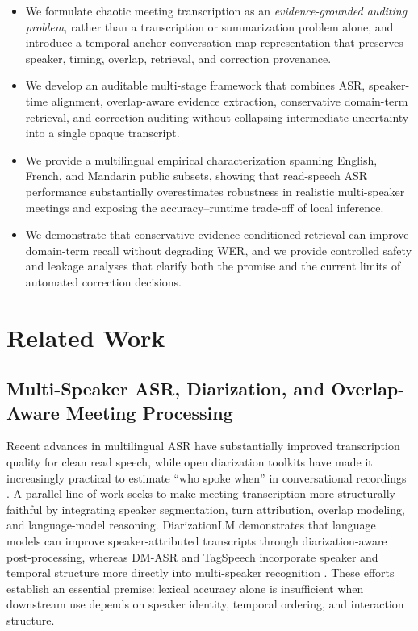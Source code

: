 \documentclass[10pt,twocolumn]{article}
\begin{document}
\begin{itemize}
    \item We formulate chaotic meeting transcription as an \textit{evidence-grounded auditing problem}, rather than a transcription or summarization problem alone, and introduce a temporal-anchor conversation-map representation that preserves speaker, timing, overlap, retrieval, and correction provenance.
    \item We develop an auditable multi-stage framework that combines ASR, speaker-time alignment, overlap-aware evidence extraction, conservative domain-term retrieval, and correction auditing without collapsing intermediate uncertainty into a single opaque transcript.
    \item We provide a multilingual empirical characterization spanning English, French, and Mandarin public subsets, showing that read-speech ASR performance substantially overestimates robustness in realistic multi-speaker meetings and exposing the accuracy--runtime trade-off of local inference.
    \item We demonstrate that conservative evidence-conditioned retrieval can improve domain-term recall without degrading WER, and we provide controlled safety and leakage analyses that clarify both the promise and the current limits of automated correction decisions.
\end{itemize}

\section{Related Work}

\subsection{Multi-Speaker ASR, Diarization, and Overlap-Aware Meeting Processing}

Recent advances in multilingual ASR have substantially improved transcription quality for clean read speech, while open diarization toolkits have made it increasingly practical to estimate ``who spoke when'' in conversational recordings \cite{radford2023whisper,bredin2020pyannote}. A parallel line of work seeks to make meeting transcription more structurally faithful by integrating speaker segmentation, turn attribution, overlap modeling, and language-model reasoning. DiarizationLM demonstrates that language models can improve speaker-attributed transcripts through diarization-aware post-processing, whereas DM-ASR and TagSpeech incorporate speaker and temporal structure more directly into multi-speaker recognition \cite{wang2024diarizationlm,li2026dmasr,huo2026tagspeech}. These efforts establish an essential premise: lexical accuracy alone is insufficient when downstream use depends on speaker identity, temporal ordering, and interaction structure.
\end{document}

